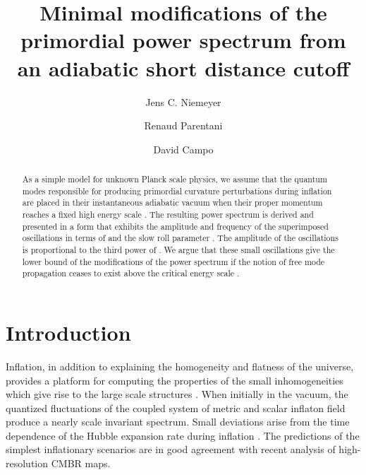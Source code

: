 \documentclass[a4paper,aps,prd,preprint,groupedaddress,nofootinbib]{revtex4}
\begin{document}
\title{Minimal modifications of the primordial power spectrum from an
adiabatic short distance cutoff}   

\author{Jens C. Niemeyer}
\author{Renaud Parentani}
\author{David Campo}


\begin{abstract}
As a simple model for unknown Planck scale physics, we assume that the
quantum modes responsible for producing primordial curvature
perturbations during inflation are placed in their instantaneous
adiabatic vacuum when their proper momentum reaches a fixed high
energy scale \coordHE{}. The resulting power spectrum is derived and
presented in a form that exhibits the amplitude and frequency of the
superimposed oscillations in terms of \coordHE{}
and the slow roll parameter \myHighlight{$\epsilon$}\coordHE{}. The amplitude of the
oscillations  is proportional to the third power of \coordHE{}.  We argue
that these small oscillations give the lower bound of the
modifications of the power spectrum if the notion of free mode
propagation ceases to exist above the critical energy scale \coordHE{}.
\end{abstract}

\pacs{}

\maketitle

\section{Introduction}

Inflation, in addition to explaining the homogeneity and flatness of
the universe, provides a platform for computing the properties of the
small  inhomogeneities which give rise to the large scale  structures
\cite{L90,LL00}.  When initially in the vacuum, the quantized
fluctuations of the coupled system of metric and scalar inflaton field
produce a nearly scale invariant spectrum. Small deviations arise from
the time dependence of the  Hubble expansion rate during inflation
\cite{MFB92}.  The  predictions of the simplest inflationary scenarios
are in good agreement with recent analysis of high-resolution CMBR
maps.
\end{document}
